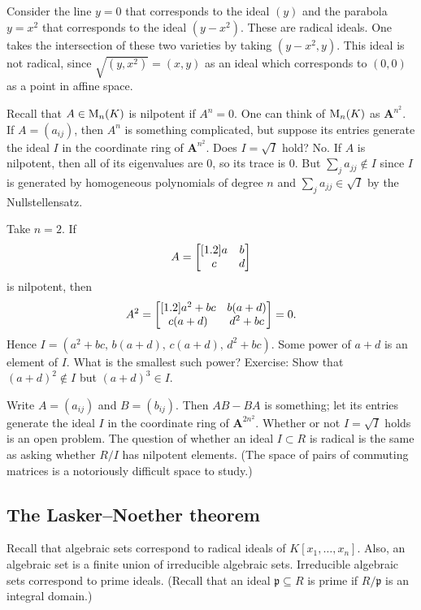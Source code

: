 \documentclass [11 pt, oneside, margin = 1 in] {article}
\begin{document}
\begin{example}[ ]\label{}\text{}
Consider the line $y=0$ that corresponds to the ideal $(y)$ and the parabola $y=x^2$ that corresponds to the ideal $(y-x^2)$. These are radical ideals. One takes the intersection of these two varieties by taking $(y-x^2, y)$. This ideal is not radical, since $\sqrt{(y, x^2)}=(x,y)$ as an ideal which corresponds to $(0,0)$ as a point in affine space.
\end{example}


\begin{example}\label{}\text{}
Recall that $A\in \operatorname{M}_n(K)$ is nilpotent if $A^n = 0$. One can think of $\operatorname{M}_n(K)$ as $\mathbf{A}^{n^2}$. If $A = (a_{ij})$, then $A^n$ is something complicated, but suppose its entries generate the ideal $I$ in the coordinate ring of $\mathbf{A}^{n^2}$. Does $I=\sqrt{I} $ hold? No. If $A$ is nilpotent, then all of its eigenvalues are $0$, so its trace is $0$. But $\sum_{j}^{} a_{jj}\notin I$ since $I$ is generated by homogeneous polynomials of degree $n$ and $\sum_{j}^{} a_{jj} \in \sqrt{I} $ by the Nullstellensatz.

Take $n=2$. If 
\begin{align*}
	A = \begin{bmatrix} [ 1.2 ] a&b\\c&d\end{bmatrix}
\end{align*}
is nilpotent, then
\begin{align*}
	A^2 = \begin{bmatrix} [ 1.2 ] a^2 + bc&b(a+d)\\c (a+d) &d^2 + bc\end{bmatrix} = 0.
\end{align*}
Hence $I=   (a^2+bc,\, b(a+d), \,c (a+d),\,d^2 + bc)$. Some power of $a+d$ is an element of $I$. What is the smallest such power? Exercise: Show that $(a+d)^2\notin I$ but $(a+d)^3\in I$.
\end{example}

\begin{example}\label{}\text{}
Write $A=(a_{ij})$ and $B=(b_{ij})$. Then $AB-BA$ is something; let its entries generate the ideal $I$ in the coordinate ring of $\mathbf{A}^{2n^2}$. Whether or not $I=\sqrt{I} $ holds is an open problem. The question of whether an ideal $I\subset R$ is radical is the same as asking whether $R/I$ has nilpotent elements. (The space of pairs of commuting matrices is a notoriously difficult space to study.)
\end{example}

\subsection{The Lasker--Noether theorem}
Recall that algebraic sets correspond to radical ideals of $K[x_1,\hdots, x_n]$. Also, an algebraic set is a finite union of irreducible algebraic sets. Irreducible algebraic sets correspond to prime ideals. (Recall that an ideal $\mathfrak{p}\subseteq R$ is prime if $R/\mathfrak{p}$ is an integral domain.)
\end{document}
